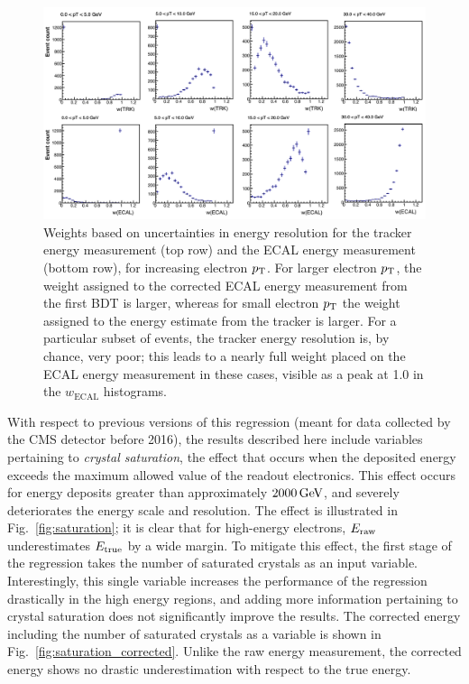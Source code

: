 \begin{figure}[hbtp]
  \begin{center}
    \includegraphics[width=0.99\linewidth]{img/regression/weightplot.pdf}
    \caption{
        Weights based on uncertainties in energy resolution for the tracker energy measurement (top row) and the ECAL energy measurement (bottom row), for increasing electron $p_\mathrm{T}$.
        For larger electron $p_\mathrm{T}$, the weight assigned to the corrected ECAL energy measurement from the first BDT is larger, whereas for small electron $p_\mathrm{T}$ the weight assigned to the energy estimate from the tracker is larger.
        For a particular subset of events, the tracker energy resolution is, by chance, very poor; this leads to a nearly full weight placed on the ECAL energy measurement in these cases, visible as a peak at 1.0 in the $w_\text{ECAL}$ histograms.
        }
    \label{fig:regressionweights}
  \end{center}
\end{figure}


With respect to previous versions of this regression (meant for data collected by the CMS detector before 2016), the results described here include variables pertaining to \textit{crystal saturation}, the effect that occurs when the deposited energy exceeds the maximum allowed value of the readout electronics.
% 
This effect occurs for energy deposits greater than approximately $2000\,\text{GeV}$, and severely deteriorates the energy scale and resolution.
% 
The effect is illustrated in Fig.~\ref{fig:saturation}; it is clear that for high-energy electrons, $E_\text{raw}$ underestimates $E_\text{true}$ by a wide margin.
% 
To mitigate this effect, the first stage of the regression takes the number of saturated crystals as an input variable.
% 
Interestingly, this single variable increases the performance of the regression drastically in the high energy regions, and adding more information pertaining to crystal saturation does not significantly improve the results.
% 
The corrected energy including the number of saturated crystals as a variable is shown in Fig.~\ref{fig:saturation_corrected}.
% 
Unlike the raw energy measurement, the corrected energy shows no drastic underestimation with respect to the true energy.


